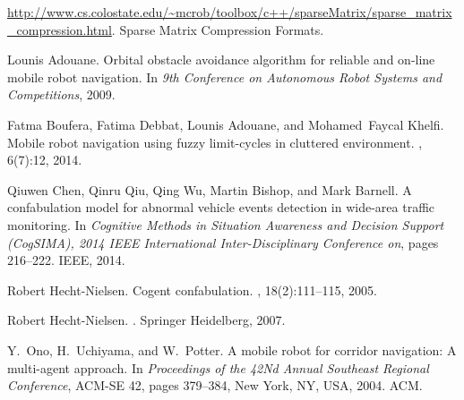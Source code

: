\documentclass[journal]{IEEEtran}
\begin{document}
%
%
%

%
\begin{thebibliography}{7}

\url{http://www.cs.colostate.edu/~mcrob/toolbox/c++/sparseMatrix/sparse_matrix_compression.html}.
\newblock Sparse Matrix Compression Formats.

Lounis Adouane.
\newblock Orbital obstacle avoidance algorithm for reliable and on-line mobile
  robot navigation.
\newblock In {\em 9th Conference on Autonomous Robot Systems and Competitions},
  2009.

Fatma Boufera, Fatima Debbat, Lounis Adouane, and Mohamed~Faycal Khelfi.
\newblock Mobile robot navigation using fuzzy limit-cycles in cluttered
  environment.
,
  6(7):12, 2014.

Qiuwen Chen, Qinru Qiu, Qing Wu, Martin Bishop, and Mark Barnell.
\newblock A confabulation model for abnormal vehicle events detection in
  wide-area traffic monitoring.
\newblock In {\em Cognitive Methods in Situation Awareness and Decision Support
  (CogSIMA), 2014 IEEE International Inter-Disciplinary Conference on}, pages
  216--222. IEEE, 2014.

Robert Hecht-Nielsen.
\newblock Cogent confabulation.
, 18(2):111--115, 2005.

Robert Hecht-Nielsen.
.
\newblock Springer Heidelberg, 2007.

Y.~Ono, H.~Uchiyama, and W.~Potter.
\newblock A mobile robot for corridor navigation: A multi-agent approach.
\newblock In {\em Proceedings of the 42Nd Annual Southeast Regional
  Conference}, ACM-SE 42, pages 379--384, New York, NY, USA, 2004. ACM.

\end{thebibliography}
\nocite{*}
\end{document}
